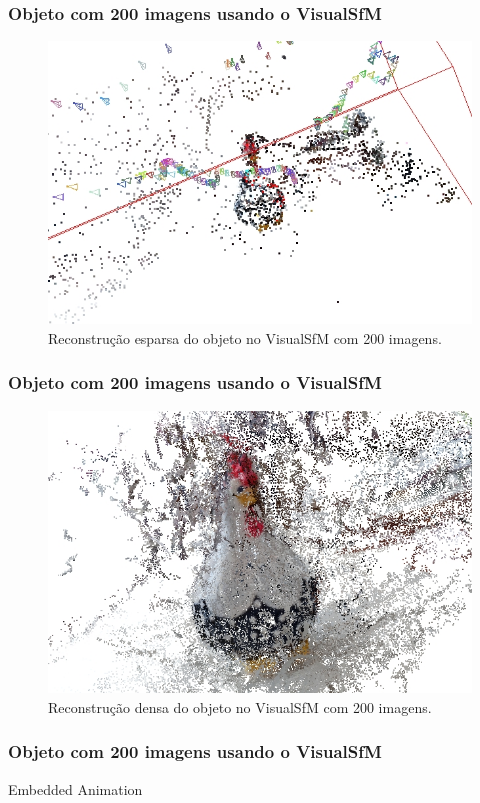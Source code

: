 \documentclass[table, usenames, svgnames, xcolor=dvipsnames]{beamer}
\begin{document}
\begin{frame}
\frametitle{\textbf{Objeto com 200 imagens usando o VisualSfM}}
	\begin{figure}[!h]
		\centering
		\includegraphics[width=0.8\linewidth]{figs/galinhasparsa.jpg}
		\caption{%
		Reconstrução esparsa do objeto no VisualSfM com 200 imagens.
		}
	\end{figure}
\end{frame}

\begin{frame}
\frametitle{\textbf{Objeto com 200 imagens usando o VisualSfM}}
	\begin{figure}[!h]
		\centering
		\includegraphics[width=0.8\linewidth]{figs/galinhadense.jpg}
		\caption{%
		Reconstrução densa do objeto no VisualSfM com 200 imagens.
		}
	\end{figure}
\end{frame}

\begin{frame}
\frametitle{\textbf{Objeto com 200 imagens usando o VisualSfM}}
	{Embedded Animation}
\end{frame}
\end{document}
